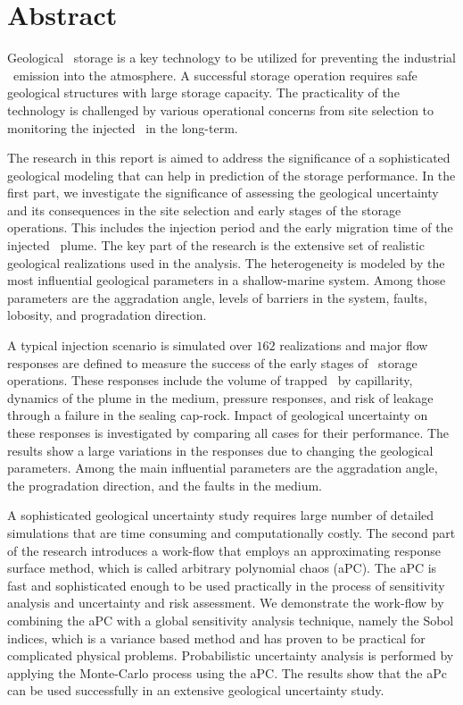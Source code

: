\chapter{Abstract}

Geological \coo\ storage is a key technology to be utilized for preventing the industrial \coo\ emission into the atmosphere. A successful storage operation requires safe geological structures with large storage capacity. The practicality of the technology is challenged by various operational concerns from site selection to monitoring the injected \coo\ in the long-term. 

The research in this report is aimed to address the significance of a sophisticated geological modeling that can help in prediction of the storage performance. In the first part, we investigate the significance of assessing the geological uncertainty and its consequences in the site selection and early stages of the storage operations. This includes the injection period and the early migration time of the injected \coo\ plume. The key part of the research is the extensive set of realistic geological realizations used in the analysis. The
heterogeneity is modeled by the most influential geological parameters in a shallow-marine system. Among those parameters are the aggradation angle, levels of barriers in the system, faults,
lobosity, and progradation direction. 

A typical injection scenario is simulated over $162$ realizations and major flow responses are defined to measure the success of the early stages of \coo\ storage operations. These responses include the volume of trapped \coo\ by capillarity, dynamics of the plume in the medium, pressure responses, and risk of leakage through a failure in the sealing cap-rock. Impact of geological uncertainty on these responses is investigated by comparing all cases for their performance. The results show a large variations in the responses due to changing the geological parameters. Among the main influential parameters are the aggradation angle, the progradation direction, and the faults in the medium.
 
A sophisticated geological uncertainty study requires large number of detailed simulations that are time consuming and computationally costly. The second part of the research introduces a work-flow that employs an approximating response surface method, which is called arbitrary polynomial chaos (aPC).  The aPC is fast and sophisticated enough to be used practically in the process of sensitivity analysis and uncertainty and risk assessment. We demonstrate the work-flow by combining the aPC with a global sensitivity analysis technique, namely the Sobol indices, which is a variance based method and has proven to be practical for complicated physical problems. Probabilistic uncertainty analysis is performed by applying the Monte-Carlo process using the aPC. The results show that the aPc can be used successfully in an extensive geological uncertainty study.
